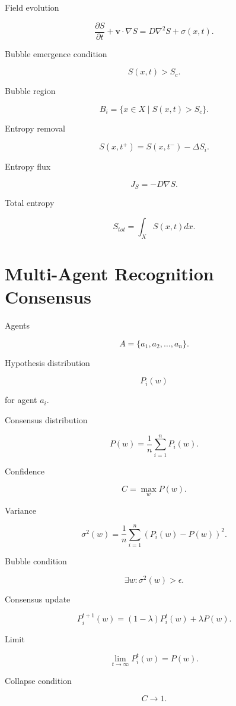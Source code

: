 \documentclass[11pt]{article}
\begin{document}
Field evolution

\[
\frac{\partial S}{\partial t}
+
\mathbf{v}\cdot\nabla S
=
D\nabla^2 S + \sigma(x,t).
\]

Bubble emergence condition

\[
S(x,t) > S_c.
\]

Bubble region

\[
B_i =
\{x \in X \mid S(x,t) > S_c\}.
\]

Entropy removal

\[
S(x,t^+) =
S(x,t^-)-\Delta S_i.
\]

Entropy flux

\[
J_S = -D\nabla S.
\]

Total entropy

\[
S_{tot} =
\int_X S(x,t) dx.
\]


\section{Multi-Agent Recognition Consensus}

Agents

\[
A = \{a_1,a_2,\dots,a_n\}.
\]

Hypothesis distribution

\[
P_i(w)
\]

for agent $a_i$.

Consensus distribution

\[
P(w)
=
\frac{1}{n}
\sum_{i=1}^{n} P_i(w).
\]

Confidence

\[
C = \max_w P(w).
\]

Variance

\[
\sigma^2(w) =
\frac{1}{n}
\sum_{i=1}^{n}
(P_i(w)-P(w))^2.
\]

Bubble condition

\[
\exists w :
\sigma^2(w) > \epsilon.
\]

Consensus update

\[
P_i^{t+1}(w)
=
(1-\lambda)P_i^t(w)
+
\lambda P(w).
\]

Limit

\[
\lim_{t\to\infty}
P_i^t(w)
=
P(w).
\]

Collapse condition

\[
C \to 1.
\]

\end{document}
